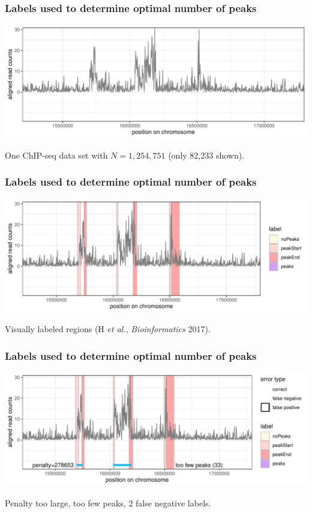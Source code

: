 \documentclass{beamer}
\begin{document}
\begin{frame}
  \frametitle{Labels used to determine optimal number of peaks}
  \includegraphics[width=\textwidth]{jss-figure-label-error-data}
  
  One ChIP-seq data set with $N=1,254,751$ (only 82,233 shown).
\end{frame}

\begin{frame}
  \frametitle{Labels used to determine optimal number of peaks}
  \includegraphics[width=\textwidth]{jss-figure-label-error-data-labels}

  Visually labeled regions (H {\it et al.}, {\it Bioinformatics} 2017). 
\end{frame}

\begin{frame}
  \frametitle{Labels used to determine optimal number of peaks}
  \includegraphics[width=\textwidth]{jss-figure-label-error-too-few}

  Penalty too large, too few peaks, 2 false negative labels.
\end{frame}
\end{document}
